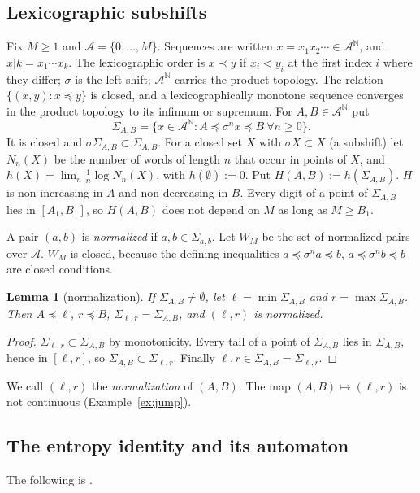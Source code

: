 \documentclass[11pt]{amsart}
\newtheorem{lemma}[theorem]{Lemma}
\theoremstyle{definition}
\theoremstyle{remark}
\newcommand{\N}{\mathbb{N}}
\newcommand{\lex}{\preccurlyeq}
\newcommand{\A}{\mathcal{A}}
\begin{document}
\subsection{Lexicographic subshifts}
Fix $M\ge1$ and $\A=\{0,\dots,M\}$. Sequences are written $x=x_1x_2\cdots\in\A^{\N}$, and $x|k=x_1\cdots x_k$. The lexicographic order is $x\prec y$ if $x_i<y_i$ at the first index $i$ where they differ; $\sigma$ is the left shift; $\A^{\N}$ carries the product topology. The relation $\{(x,y):x\lex y\}$ is closed, and a lexicographically monotone sequence converges in the product topology to its infimum or supremum. For $A,B\in\A^{\N}$ put
\[
\Sigma_{A,B}=\{x\in\A^{\N}:A\lex\sigma^nx\lex B\ \forall n\ge0\}.
\]
It is closed and $\sigma\Sigma_{A,B}\subset\Sigma_{A,B}$. For a closed set $X$ with $\sigma X\subset X$ (a subshift) let $N_n(X)$ be the number of words of length $n$ that occur in points of $X$, and $h(X)=\lim_n\frac1n\log N_n(X)$, with $h(\emptyset):=0$. Put $H(A,B):=h(\Sigma_{A,B})$. $H$ is non-increasing in $A$ and non-decreasing in $B$. Every digit of a point of $\Sigma_{A,B}$ lies in $[A_1,B_1]$, so $H(A,B)$ does not depend on $M$ as long as $M\ge B_1$.

A pair $(a,b)$ is \emph{normalized} if $a,b\in\Sigma_{a,b}$. Let $W_M$ be the set of normalized pairs over $\A$. $W_M$ is closed, because the defining inequalities $a\lex\sigma^na\lex b$, $a\lex\sigma^nb\lex b$ are closed conditions.

\begin{lemma}[normalization]\label{lem:norm}
If $\Sigma_{A,B}\ne\emptyset$, let $\ell=\min\Sigma_{A,B}$ and $r=\max\Sigma_{A,B}$. Then $A\lex\ell$, $r\lex B$, $\Sigma_{\ell,r}=\Sigma_{A,B}$, and $(\ell,r)$ is normalized.
\end{lemma}

\begin{proof}
$\Sigma_{\ell,r}\subset\Sigma_{A,B}$ by monotonicity. Every tail of a point of $\Sigma_{A,B}$ lies in $\Sigma_{A,B}$, hence in $[\ell,r]$, so $\Sigma_{A,B}\subset\Sigma_{\ell,r}$. Finally $\ell,r\in\Sigma_{A,B}=\Sigma_{\ell,r}$.
\end{proof}

We call $(\ell,r)$ the \emph{normalization} of $(A,B)$. The map $(A,B)\mapsto(\ell,r)$ is not continuous (Example~\ref{ex:jump}).

\subsection{The entropy identity and its automaton}
The following is \cite[Theorem~7.1]{Nem26}.
\end{document}
